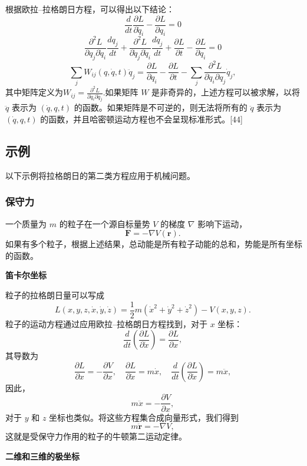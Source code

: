 根据欧拉–拉格朗日方程，可以得出以下结论：
\[
\frac{d}{dt} \frac{\partial L}{\partial \dot{q}_{i}} - \frac{\partial L}{\partial q_{i}} = 0~
\]
\[
\frac{\partial^{2} L}{\partial q_{j} \partial \dot{q}_{i}} \frac{dq_{j}}{dt} + \frac{\partial^{2} L}{\partial \dot{q}_{j} \partial \dot{q}_{i}} \frac{d\dot{q}_{j}}{dt} + \frac{\partial L}{\partial t} - \frac{\partial L}{\partial q_{i}} = 0~
\]
\[
\sum_{j} W_{ij}(q, \dot{q}, t) \ddot{q}_{j} = \frac{\partial L}{\partial q_{i}} - \frac{\partial L}{\partial t} - \sum_{j} \frac{\partial^{2} L}{\partial \dot{q}_{i} \partial q_{j}} \dot{q}_{j},~
\]
其中矩阵定义为\(W_{ij} = \frac{\partial^{2} L}{\partial \dot{q}_{i} \partial \dot{q}_{j}}.\)如果矩阵 \( W \) 是非奇异的，上述方程可以被求解，以将 \( \ddot{q} \) 表示为 \( (\dot{q}, q, t) \) 的函数。如果矩阵是不可逆的，则无法将所有的 \( \ddot{q} \) 表示为 \( (\dot{q}, q, t) \) 的函数，并且哈密顿运动方程也不会呈现标准形式。[44]
\subsection{示例}
以下示例将拉格朗日的第二类方程应用于机械问题。
\subsubsection{保守力}
一个质量为 \( m \) 的粒子在一个源自标量势 \( V \) 的梯度 \( \nabla \) 影响下运动，
\[
\mathbf{F} = -\nabla V(\mathbf{r}).~
\]
如果有多个粒子，根据上述结果，总动能是所有粒子动能的总和，势能是所有坐标的函数。

\textbf{笛卡尔坐标}

粒子的拉格朗日量可以写成
\[
L(x, y, z, \dot{x}, \dot{y}, \dot{z}) = \frac{1}{2} m (\dot{x}^2 + \dot{y}^2 + \dot{z}^2) - V(x, y, z).~
\]
粒子的运动方程通过应用欧拉–拉格朗日方程找到，对于 \( x \) 坐标：
\[
\frac{d}{dt} \left( \frac{\partial L}{\partial \dot{x}} \right) = \frac{\partial L}{\partial x},~
\]
其导数为
\[
\frac{\partial L}{\partial x} = -\frac{\partial V}{\partial x}, \quad \frac{\partial L}{\partial \dot{x}} = m \dot{x}, \quad \frac{d}{dt} \left( \frac{\partial L}{\partial \dot{x}} \right) = m \ddot{x},~
\]
因此，
\[
m \ddot{x} = -\frac{\partial V}{\partial x},~
\]
对于 \( y \) 和 \( z \) 坐标也类似。将这些方程集合成向量形式，我们得到
\[
m \ddot{\mathbf{r}} = -\nabla V,~
\]
这就是受保守力作用的粒子的牛顿第二运动定律。

\textbf{二维和三维的极坐标}

